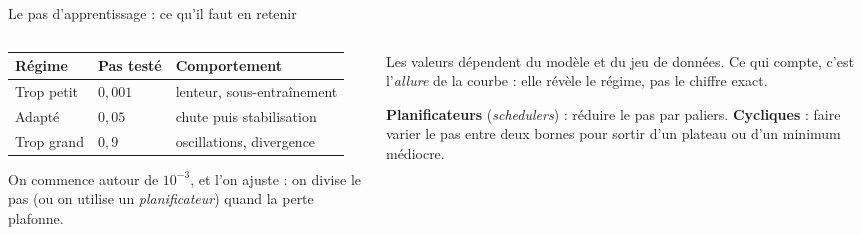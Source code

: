 \begin{frame}{Le pas d'apprentissage : ce qu'il faut en retenir}
\begin{columns}[t]
\begin{column}{0.52\textwidth}
\begin{center}
\begin{tabular}{@{}lll@{}}
\toprule
\textbf{Régime} & \textbf{Pas testé} & \textbf{Comportement} \\
\midrule
Trop petit & $0{,}001$ & lenteur, sous-entraînement \\
Adapté & $0{,}05$ & chute puis stabilisation \\
Trop grand & $0{,}9$ & oscillations, divergence \\
\bottomrule
\end{tabular}
\end{center}
\begin{kbox}
On commence autour de $10^{-3}$, et l'on ajuste : on divise le pas (ou on
utilise un \emph{planificateur}) quand la perte plafonne.
\end{kbox}
\end{column}
\begin{column}{0.46\textwidth}
\begin{wbox}
Les valeurs dépendent du modèle et du jeu de données. Ce qui compte, c'est
l'\emph{allure} de la courbe : elle révèle le régime, pas le chiffre exact.
\end{wbox}
\begin{ebox}
\textbf{Planificateurs} (\emph{schedulers}) : réduire le pas par paliers.
\textbf{Cycliques} : faire varier le pas entre deux bornes pour sortir d'un
plateau ou d'un minimum médiocre.
\end{ebox}
\end{column}
\end{columns}
\end{frame}

